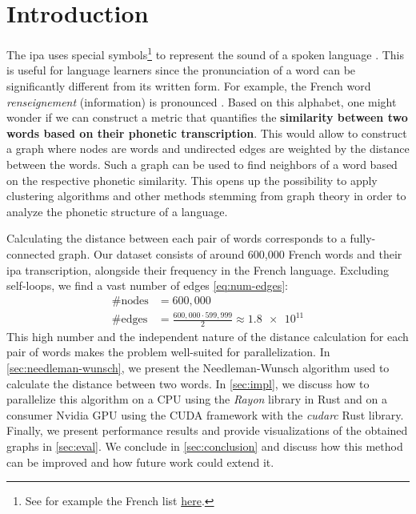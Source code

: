 \section{Introduction}

The \gls{ipa} uses special symbols\footnote{See for example the French list \href{https://en.wikipedia.org/wiki/Help:IPA/French}{here}.} to represent the sound of a spoken language \cite{ipa}. This is useful for language learners since the pronunciation of a word can be significantly different from its written form. For example, the French word \textit{renseignement} (information) is pronounced . Based on this alphabet, one might wonder if we can construct a metric that quantifies the \textbf{similarity between two words based on their phonetic transcription}. This would allow to construct a graph where nodes are words and undirected edges are weighted by the distance between the words. Such a graph can be used to find neighbors of a word based on the respective phonetic similarity. This opens up the possibility to apply clustering algorithms and other methods stemming from graph theory in order to analyze the phonetic structure of a language.

Calculating the distance between each pair of words corresponds to a fully-connected graph. Our dataset consists of around 600,000 French words and their \gls{ipa} transcription, alongside their frequency in the French language. Excluding self-loops, we find a vast number of edges \eqref{eq:num-edges}:
\begin{align}
    \text{\#nodes} &= 600,000 \\
    \text{\#edges} &= \frac{600,000 \cdot 599,999}{2} \approx \num{1.8e11}
\end{align}
This high number and the independent nature of the distance calculation for each pair of words makes the problem well-suited for parallelization. In \autoref{sec:needleman-wunsch}, we present the Needleman-Wunsch algorithm used to calculate the distance between two words. In \autoref{sec:impl}, we discuss how to parallelize this algorithm on a CPU using the \textit{Rayon} library in Rust and on a consumer Nvidia GPU using the CUDA framework with the \textit{cudarc} Rust library. Finally, we present performance results and provide visualizations of the obtained graphs in \autoref{sec:eval}. We conclude in \autoref{sec:conclusion} and discuss how this method can be improved and how future work could extend it.


